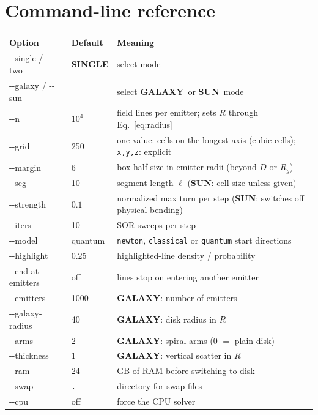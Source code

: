 \documentclass[12pt]{article}
\newcommand{\GALAXY}{\textcolor{galaxyc}{\textbf{\textsf{GALAXY}}}}
\newcommand{\SUN}{\textcolor{sunc}{\textbf{\textsf{SUN}}}}
\newcommand{\SINGLE}{\textbf{\textsf{SINGLE}}}
\begin{document}
\section{Command-line reference}

{\small
\renewcommand{\arraystretch}{1.15}
\begin{longtable}{@{}>{\ttfamily}p{3.6cm}p{2.2cm}p{8.6cm}@{}}
\toprule
\normalfont\textbf{Option} & \textbf{Default} & \textbf{Meaning}\\
\midrule
\endhead
-{}-single / -{}-two & \SINGLE & select mode \\
-{}-galaxy / -{}-sun & & select \GALAXY\ or \SUN\ mode \\
-{}-n & $10^4$ & field lines per emitter; sets $R$ through Eq.~\eqref{eq:radius} \\
-{}-grid & 250 & one value: cells on the longest axis (cubic cells); \texttt{x,y,z}: explicit \\
-{}-margin & 6 & box half-size in emitter radii (beyond $D$ or $R_g$) \\
-{}-seg & 10 & segment length $\ell$ (\SUN: cell size unless given) \\
-{}-strength & $0.1$ & normalized max turn per step (\SUN: switches off physical bending) \\
-{}-iters & 10 & SOR sweeps per step \\
-{}-model & quantum & \texttt{newton}, \texttt{classical} or \texttt{quantum} start directions \\
-{}-highlight & 0.25 & highlighted-line density / probability \\
-{}-end-at-emitters & off & lines stop on entering another emitter \\
-{}-emitters & 1000 & \GALAXY: number of emitters \\
-{}-galaxy-radius & 40 & \GALAXY: disk radius in $R$ \\
-{}-arms & 2 & \GALAXY: spiral arms (0 $=$ plain disk) \\
-{}-thickness & 1 & \GALAXY: vertical scatter in $R$ \\
-{}-ram & 24 & GB of RAM before switching to disk \\
-{}-swap & \texttt{.} & directory for swap files \\
-{}-cpu & off & force the CPU solver \\
\bottomrule
\end{longtable}
}
\end{document}
